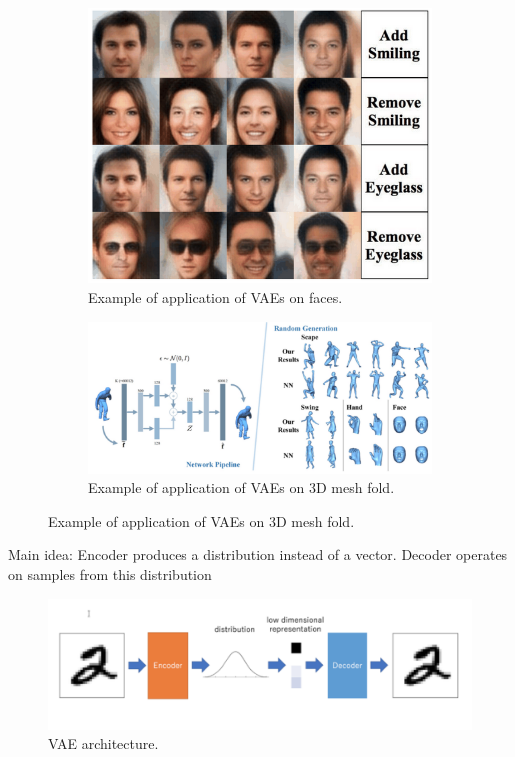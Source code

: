 \begin{figure}[H]
    \centering
    \begin{subfigure}[b]{0.45\textwidth}
        \centering
        \includegraphics[width=\textwidth]{images/DimRed/vaes-1.png}
        \caption{Example of application of VAEs on faces.}
        \label{fig:vaes_1}
    \end{subfigure}
    \hfill
    \begin{subfigure}[b]{0.45\textwidth}
        \centering
        \includegraphics[width=\textwidth]{images/DimRed/vaes-2.png}
        \caption{Example of application of VAEs on 3D mesh fold.}
        \label{fig:vaes_2}
    \end{subfigure}
\end{figure}

Main idea: Encoder produces a distribution instead of a vector. Decoder operates on samples from this distribution

\begin{figure}[H]
    \centering
    \includegraphics[width=12cm]{images/DimRed/vae.png}
    \caption{VAE architecture.}
    \label{fig:non-linear-manifold}
\end{figure}

